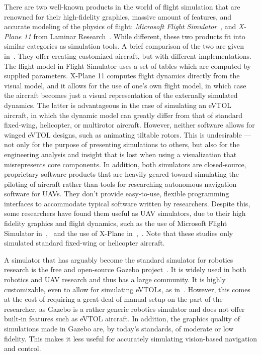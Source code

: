 There are two well-known products in the world of flight simulation that are renowned for their high-fidelity graphics, massive amount of features, and accurate modeling of the physics of flight: \textit{Microsoft Flight Simulator}~\cite{Microsoft2020}, and \textit{X-Plane 11} from Laminar Research~\cite{X-plane112020}. While different, these two products fit into similar categories as simulation tools. A brief comparison of the two are given in~\cite{Gimenes2008}. They offer creating customized aircraft, but with different implementations. The flight model in Flight Simulator uses a set of tables which are computed by supplied parameters. X-Plane 11 computes flight dynamics directly from the visual model, and it allows for the use of one's own flight model, in which case the aircraft becomes just a visual representation of the externally simulated dynamics. The latter is advantageous in the case of simulating an eVTOL aircraft, in which the dynamic model can greatly differ from that of standard fixed-wing, helicopter, or multirotor aircraft. However, neither software allows for winged eVTOL designs, such as animating tiltable rotors. This is undesirable --- not only for the purpose of presenting simulations to others, but also for the engineering analysis and insight that is lost when using a visualization that misrepresents core components. In addition, both simulators are closed-source, proprietary software products that are heavily geared toward simulating the piloting of aircraft rather than tools for researching autonomous navigation software for UAVs. They don't provide easy-to-use, flexible programming interfaces to accommodate typical software written by researchers. Despite this, some researchers have found them useful as UAV simulators, due to their high fidelity graphics and flight dynamics, such as the use of Microsoft Flight Simulator in~\cite{Marcu2011},~\cite{Louali2011} and the use of X-Plane in~\cite{Garcia2010},~\cite{Cho2021}. Note that these studies only simulated standard fixed-wing or helicopter aircraft.


A simulator that has arguably become the standard simulator for robotics research is the free and open-source Gazebo project~\cite{Koenig2004}. It is widely used in both robotics and UAV research and thus has a large community. It is highly customizable, even to allow for simulating eVTOLs, as in~\cite{Carlson2021}. However, this comes at the cost of requiring a great deal of manual setup on the part of the researcher, as Gazebo is a rather generic robotics simulator and does not offer built-in features such as eVTOL aircraft. In addition, the graphics quality of simulations made in Gazebo are, by today's standards, of moderate or low fidelity. This makes it less useful for accurately simulating vision-based navigation and control.

